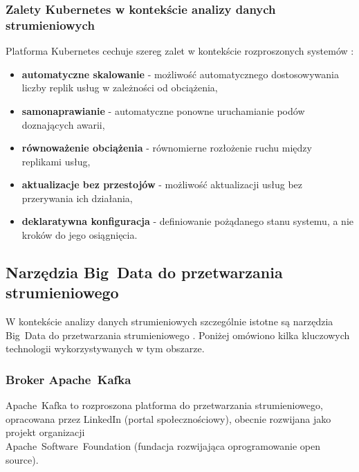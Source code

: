 \subsubsection{Zalety Kubernetes w kontekście analizy danych strumieniowych}
\label{subsubsec:zalety_kubernetes}

Platforma Kubernetes cechuje szereg zalet w kontekście rozproszonych systemów \cite{kubernetes_benefits}:

\begin{itemize}
    \item \textbf{automatyczne skalowanie} - możliwość automatycznego dostosowywania liczby replik usług w zależności od obciążenia,
    \item \textbf{samonaprawianie} - automatyczne ponowne uruchamianie podów doznających awarii,
    \item \textbf{równoważenie obciążenia} - równomierne rozłożenie ruchu między replikami usług,
    \item \textbf{aktualizacje bez przestojów} - możliwość aktualizacji usług bez przerywania ich działania,
    \item \textbf{deklaratywna konfiguracja} - definiowanie pożądanego stanu systemu, a nie kroków do jego osiągnięcia.
\end{itemize}

\subsection{Narzędzia \mbox{Big Data} do przetwarzania strumieniowego}
\label{subsec:narzedzia_big_data}

W kontekście analizy danych strumieniowych szczególnie istotne są narzędzia \mbox{Big Data} do przetwarzania strumieniowego \cite{spark_streaming}.
Poniżej omówiono kilka kluczowych technologii wykorzystywanych w tym obszarze.

\subsubsection{Broker \mbox{Apache Kafka}}
\label{subsubsec:apache_kafka}

\mbox{Apache Kafka} \cite{kafka} to rozproszona platforma do przetwarzania strumieniowego, opracowana przez LinkedIn (portal społecznościowy), obecnie rozwijana jako projekt
organizacji \\ \mbox{Apache Software Foundation} (fundacja rozwijająca oprogramowanie open source). 

\vspace{0.3em}

